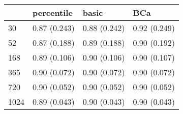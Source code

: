 \begin{tabular}{llll}
\toprule
 & percentile & basic & BCa \\
\midrule
30 & 0.87 (0.243) & 0.88 (0.242) & 0.92 (0.249) \\
52 & 0.87 (0.188) & 0.89 (0.188) & 0.90 (0.192) \\
168 & 0.89 (0.106) & 0.90 (0.106) & 0.90 (0.107) \\
365 & 0.90 (0.072) & 0.90 (0.072) & 0.90 (0.072) \\
720 & 0.90 (0.052) & 0.90 (0.052) & 0.90 (0.052) \\
1024 & 0.89 (0.043) & 0.90 (0.043) & 0.90 (0.043) \\
\bottomrule
\end{tabular}

